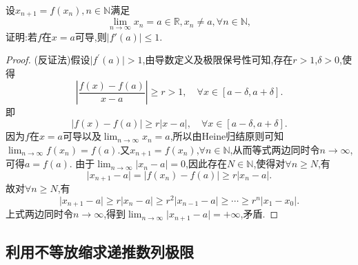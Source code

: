 \documentclass[../../main.tex]{subfiles}
\begin{document}
\begin{proposition}[反向压缩映像]\label{proposition:反向压缩映像}
设\(x_{n + 1} = f(x_n),n\in\mathbb{N}\)满足
\[
\lim_{n \to \infty} x_n = a\in\mathbb{R},x_n\neq a,\forall n\in\mathbb{N},
\]
证明:若\(f\)在\(x = a\)可导,则\(\vert f'(a)\vert\leqslant  1\).
\end{proposition}
\begin{proof}
(反证法)假设\(\vert f^\prime(a)\vert > 1\),由导数定义及极限保号性可知,存在\(r > 1\),\(\delta > 0\),使得
\[
\left\vert\frac{f(x) - f(a)}{x - a}\right\vert\geqslant r > 1, \quad\forall x\in [a - \delta, a + \delta].
\]
即
\[
\vert f(x) - f(a)\vert\geqslant r\vert x - a\vert, \quad\forall x\in [a - \delta, a + \delta].
\]
因为\(f\)在\(x = a\)可导以及\(\lim_{n\rightarrow\infty}x_n = a\),所以由Heine归结原则可知\(\lim_{n\rightarrow\infty}f(x_n) = f(a)\).又\(x_{n + 1} = f(x_n)\),\(\forall n\in\mathbb{N}\),从而等式两边同时令\(n\rightarrow\infty\),可得\(a = f(a)\).
由于\(\lim_{n\rightarrow\infty}\vert x_n - a\vert = 0\),因此存在\(N\in\mathbb{N}\),使得对\(\forall n\geqslant N\),有
\[
\vert x_{n + 1} - a\vert = \vert f(x_n) - f(a)\vert\geqslant r\vert x_n - a\vert.
\]
故对\(\forall n\geqslant N\),有
\[
\vert x_{n + 1} - a\vert\geqslant r\vert x_n - a\vert\geqslant r^2\vert x_{n - 1} - a\vert\geqslant\cdots\geqslant r^n\vert x_1 - x_0\vert.
\]
上式两边同时令\(n\rightarrow\infty\),得到\(\lim_{n\rightarrow\infty}\vert x_{n + 1} - a\vert = +\infty\),矛盾.

\end{proof}


\subsection{利用不等放缩求递推数列极限}
\end{document}
